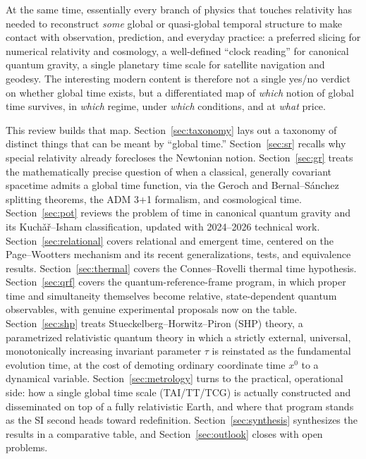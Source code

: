 \documentclass[11pt]{article}
\begin{document}
At the same time, essentially every branch of physics that touches relativity has needed to reconstruct \emph{some} global or quasi-global temporal structure to make contact with observation, prediction, and everyday practice: a preferred slicing for numerical relativity and cosmology, a well-defined ``clock reading'' for canonical quantum gravity, a single planetary time scale for satellite navigation and geodesy. The interesting modern content is therefore not a single yes/no verdict on whether global time exists, but a differentiated map of \emph{which} notion of global time survives, in \emph{which} regime, under \emph{which} conditions, and at \emph{what} price.

This review builds that map. Section~\ref{sec:taxonomy} lays out a taxonomy of distinct things that can be meant by ``global time.'' Section~\ref{sec:sr} recalls why special relativity already forecloses the Newtonian notion. Section~\ref{sec:gr} treats the mathematically precise question of when a classical, generally covariant spacetime admits a global time function, via the Geroch and Bernal--S\'anchez splitting theorems, the ADM 3+1 formalism, and cosmological time. Section~\ref{sec:pot} reviews the problem of time in canonical quantum gravity and its Kuch\v{a}\v{r}--Isham classification, updated with 2024--2026 technical work. Section~\ref{sec:relational} covers relational and emergent time, centered on the Page--Wootters mechanism and its recent generalizations, tests, and equivalence results. Section~\ref{sec:thermal} covers the Connes--Rovelli thermal time hypothesis. Section~\ref{sec:qrf} covers the quantum-reference-frame program, in which proper time and simultaneity themselves become relative, state-dependent quantum observables, with genuine experimental proposals now on the table. Section~\ref{sec:shp} treats Stueckelberg--Horwitz--Piron (SHP) theory, a parametrized relativistic quantum theory in which a strictly external, universal, monotonically increasing invariant parameter $\tau$ is reinstated as the fundamental evolution time, at the cost of demoting ordinary coordinate time $x^0$ to a dynamical variable. Section~\ref{sec:metrology} turns to the practical, operational side: how a single global time scale (TAI/TT/TCG) is actually constructed and disseminated on top of a fully relativistic Earth, and where that program stands as the SI second heads toward redefinition. Section~\ref{sec:synthesis} synthesizes the results in a comparative table, and Section~\ref{sec:outlook} closes with open problems.
\end{document}
